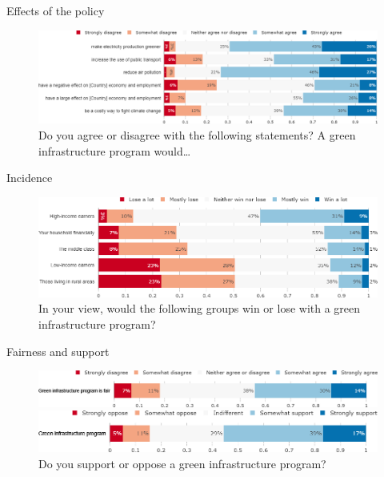 \documentclass[aspectratio=169,9pt,dvipsnames]{beamer}
\begin{document}
\begin{frame}{Effects of the policy}%


\begin{figure}[h!]
\centering
\caption{Do you agree or disagree with the following statements? A green infrastructure program would…}
\includegraphics[width=\textwidth]{../figures/DK/investments_effect_DK.png}
\end{figure}
\end{frame}

\begin{frame}{Incidence}%
\begin{figure}[h!]
\centering
\caption{In your view, would the following groups win or lose with a green infrastructure program?}
\includegraphics[width=\textwidth]{../figures/DK/investments_win_lose_DK.png}
\end{figure}
\end{frame}

\begin{frame}{Fairness and support}%
\begin{figure}[h!]
\centering
\caption{Do you agree or disagree with the following statement: ``A green infrastructure program mainly financed by public debt is fair."}
\includegraphics[width=\textwidth]{../figures/DK/investments_fair_DK.png}
\vspace{.5cm}
\centering
\caption{Do you support or oppose a green infrastructure program?}
\includegraphics[width=\textwidth]{../figures/DK/investments_support_DK.png}
\end{figure}


\end{frame}
\end{document}
